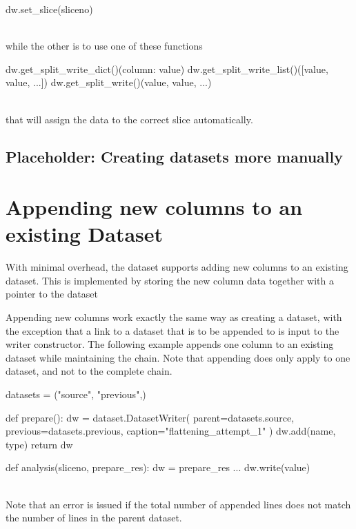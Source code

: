 \begin{python}
  dw.set_slice(sliceno)
\end{python}
\\
while the other is to use one of these functions

\begin{python}
  dw.get_split_write_dict()({column: value})
  dw.get_split_write_list()([value, value, ...])
  dw.get_split_write()(value, value, ...)
\end{python}
\\
that will assign the data to the correct slice automatically.

\subsection{Placeholder:  Creating datasets more manually}


\newpage
\section{Appending new columns to an existing Dataset}

With minimal overhead, the dataset supports adding new columns to an
existing dataset.  This is implemented by storing the new column data
together with a pointer to the dataset

Appending new columns work exactly the same way as creating a dataset,
with the exception that a link to a dataset that is to be appended to
is input to the writer constructor.  The following example appends one
column to an existing dataset while maintaining the chain.  Note that
appending does only apply to one dataset, and not to the complete
chain.

\begin{python}
datasets = ("source", "previous",)

def prepare():
  dw = dataset.DatasetWriter(
    parent=datasets.source,
    previous=datasets.previous,
    caption="flattening_attempt_1"
  )
  dw.add(name, type)
  return dw

def analysis(sliceno, prepare_res):
  dw = prepare_res
  ...
  dw.write(value)
\end{python}
\\
Note that an error is issued if the total number of appended lines
does not match the number of lines in the parent dataset.
